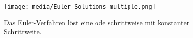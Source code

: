 \begin{frame}
    \frametitle{\insertsubsection}
    \begin{figure}
        \centering
        \texttt{[image: media/Euler-Solutions\_multiple.png]}
        \caption{Das Euler-Verfahren löst eine \ac{ode} schrittweise mit konstanter Schrittweite.}
    \end{figure}
\end{frame}



